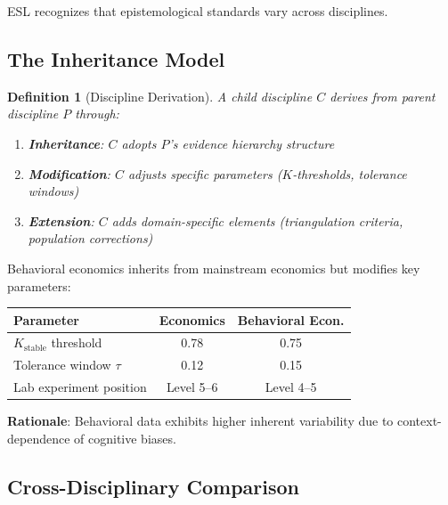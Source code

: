 \documentclass[11pt,a4paper]{article}
\newtheorem{definition}{Definition}[section]
\begin{document}

ESL recognizes that epistemological standards vary across disciplines.

\subsection{The Inheritance Model}

\begin{definition}[Discipline Derivation]
\label{def:inheritance}
A child discipline $C$ derives from parent discipline $P$ through:
\begin{enumerate}
    \item \textbf{Inheritance}: $C$ adopts $P$'s evidence hierarchy structure
    \item \textbf{Modification}: $C$ adjusts specific parameters ($K$-thresholds, tolerance windows)
    \item \textbf{Extension}: $C$ adds domain-specific elements (triangulation criteria, population corrections)
\end{enumerate}
\end{definition}

\begin{practicalbox}[title={Example: Behavioral Economics as Derivative of Economics}]
Behavioral economics inherits from mainstream economics but modifies key parameters:

\begin{center}
\begin{tabular}{lcc}
\toprule
\textbf{Parameter} & \textbf{Economics} & \textbf{Behavioral Econ.} \\
\midrule
$K_{\text{stable}}$ threshold & 0.78 & 0.75 \\
Tolerance window $\tau$ & 0.12 & 0.15 \\
Lab experiment position & Level 5--6 & Level 4--5 \\
\bottomrule
\end{tabular}
\end{center}

\textbf{Rationale}: Behavioral data exhibits higher inherent variability due to context-dependence of cognitive biases.
\end{practicalbox}

\subsection{Cross-Disciplinary Comparison}
\end{document}

